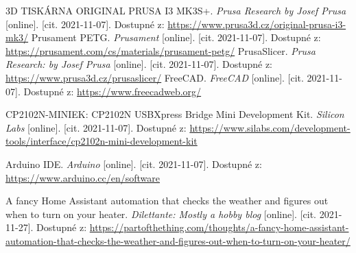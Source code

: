 \begin{thebibliography}{3}
3D TISKÁRNA ORIGINAL PRUSA I3 MK3S+. \textit{Prusa Research by Josef Prusa} [online]. [cit. 2021-11-07]. Dostupné z:  \url{https://www.prusa3d.cz/original-prusa-i3-mk3/}
Prusament PETG. \textit{Prusament} [online]. [cit. 2021-11-07]. Dostupné z: \url{https://prusament.com/cs/materials/prusament-petg/}
PrusaSlicer. \textit{Prusa Research: by Josef Prusa} [online]. [cit. 2021-11-07]. Dostupné z: \url{https://www.prusa3d.cz/prusaslicer/}
FreeCAD. \textit{FreeCAD} [online]. [cit. 2021-11-07]. Dostupné z: \url{https://www.freecadweb.org/}

CP2102N-MINIEK: CP2102N USBXpress Bridge Mini Development Kit. \textit{Silicon Labs} [online]. [cit. 2021-11-07]. Dostupné z: \url{https://www.silabs.com/development-tools/interface/cp2102n-mini-development-kit}


Arduino IDE. \textit{Arduino} [online]. [cit. 2021-11-07]. Dostupné z: \url{https://www.arduino.cc/en/software}

A fancy Home Assistant automation that checks the weather and figures out when to turn on your heater. \textit{Dilettante: Mostly a hobby blog} [online]. [cit. 2021-11-27]. Dostupné z: \url{https://partofthething.com/thoughts/a-fancy-home-assistant-automation-that-checks-the-weather-and-figures-out-when-to-turn-on-your-heater/}


\end{thebibliography}